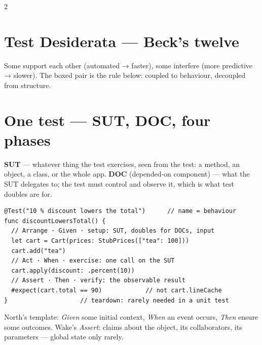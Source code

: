 \documentclass[8pt]{extarticle}
\begin{document}
\begin{multicols}{2}
\section{Test Desiderata — Beck's twelve}
\noindent{}\par
Some support each other (automated → faster), some interfere (more predictive → slower).
The boxed pair is the rule below: coupled to behaviour, decoupled from structure.

\section{One test — SUT, DOC, four phases}
\textbf{SUT} — whatever thing the test exercises, seen from the test: a method, an object, a
class, or the whole app. \textbf{DOC} (depended-on component) — what the SUT delegates to; the
test must control and observe it, which is what test doubles are for.
\begin{lstlisting}[language=SwiftSheet]
@Test("10 % discount lowers the total")      // name = behaviour
func discountLowersTotal() {
  // Arrange · Given · setup: SUT, doubles for DOCs, input
  let cart = Cart(prices: StubPrices(["tea": 100]))
  cart.add("tea")
  // Act · When · exercise: one call on the SUT
  cart.apply(discount: .percent(10))
  // Assert · Then · verify: the observable result
  #expect(cart.total == 90)            // not cart.lineCache
}                    // teardown: rarely needed in a unit test
\end{lstlisting}
North's template: \emph{Given} some initial context, \emph{When} an event occurs, \emph{Then}
ensure some outcomes. Wake's \emph{Assert}: claims about the object, its collaborators, its
parameters — global state only rarely.


\end{multicols}
\end{document}
